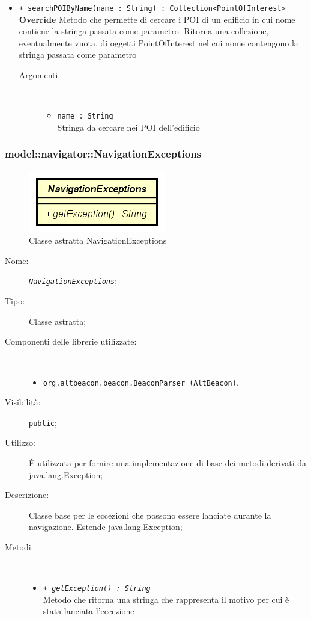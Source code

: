 \documentclass[../DefinizioneDiProdotto.tex]{subfiles}
\begin{document}
\begin{description}
\begin{itemize}
 \item \texttt{+ searchPOIByName(name : String) : Collection<PointOfInterest>}\\
\textbf{Override} Metodo che permette di cercare i POI di un edificio in cui nome contiene la stringa passata come parametro. Ritorna una collezione, eventualmente vuota,  di oggetti PointOfInterest nel cui nome contengono la stringa passata come parametro
 \begin{description}
\item[Argomenti:] \
\begin{itemize}
\item \texttt{name : String}\\
Stringa da cercare nei POI dell'edificio\end{itemize}
\end{description}
\end{itemize}
\end{description}

\subsubsection{model::navigator::NavigationExceptions}

    \begin{figure}[H]
        \centering
        \includegraphics{img/NavigationExceptions.png}
        \caption{Classe astratta NavigationExceptions}\label{fig:model::navigator::NavigationExceptions} 
    \end{figure}
    \begin{description}
\item[Nome:] \texttt{\textit{NavigationExceptions}};
\item[Tipo:] Classe astratta;
\item[Componenti delle librerie utilizzate:] \
\begin{itemize}
\item \texttt{org.altbeacon.beacon.BeaconParser (AltBeacon)}.

\end{itemize}
\item[Visibilità:] \texttt{public};
\item[Utilizzo:] È utilizzata per fornire una implementazione di base dei metodi derivati da java.lang.Exception;
\item[Descrizione:] Classe base per le eccezioni che possono essere lanciate durante la navigazione. Estende java.lang.Exception;
\item[Metodi:] \
\begin{itemize}
\item \texttt{+ \textit{getException() : String}}\\
Metodo che ritorna una stringa che rappresenta il motivo per cui è stata lanciata l'eccezione
 \end{itemize}
\end{description}
\end{document}
